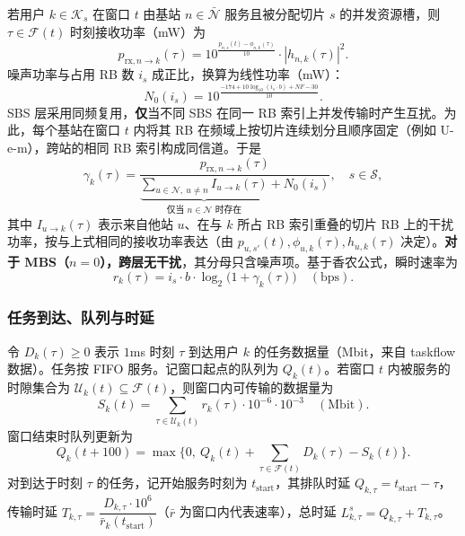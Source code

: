 若用户 $k\in\mathcal{K}_s$ 在窗口 $t$ 由基站 $n\in\bar{\mathcal{N}}$ 服务且被分配切片 $s$ 的并发资源槽，则 $\tau\in\mathcal{F}(t)$ 时刻接收功率（mW）为
\begin{equation}
 p_{\mathrm{rx},n\to k}(\tau)=10^{\frac{p_{n,s}(t)-\phi_{n,k}(\tau)}{10}}\cdot |h_{n,k}(\tau)|^2.
\end{equation}
噪声功率与占用 RB 数 $i_s$ 成正比，换算为线性功率（mW）：
\begin{equation}
 N_0(i_s)=10^{\frac{-174+10\log_{10}(i_s\cdot b)+NF-30}{10}}.
\end{equation}
SBS 层采用同频复用，\textbf{仅}当不同 SBS 在同一 RB 索引上并发传输时产生互扰。为此，每个基站在窗口 $t$ 内将其 RB 在频域上按切片连续划分且顺序固定（例如 U-e-m），跨站的相同 RB 索引构成同信道。于是
\begin{equation}
 \gamma_k(\tau)=\frac{p_{\mathrm{rx},n\to k}(\tau)}{\underbrace{\sum\limits_{u\in\mathcal{N},\ u\neq n} I_{u\to k}(\tau)}_{\text{仅当 }n\in\mathcal{N}\text{ 时存在}}+N_0(i_s)},\quad s\in\mathcal{S},
\end{equation}
其中 $I_{u\to k}(\tau)$ 表示来自他站 $u$、在与 $k$ 所占 RB 索引重叠的切片 RB 上的干扰功率，按与上式相同的接收功率表达（由 $p_{u,s'}(t),\phi_{u,k}(\tau),h_{u,k}(\tau)$ 决定）。\textbf{对于 MBS（$n=0$），跨层无干扰}，其分母只含噪声项。基于香农公式，瞬时速率为
\begin{equation}
 r_k(\tau)=i_s\cdot b\cdot \log_2\big(1+\gamma_k(\tau)\big)\quad(\mathrm{bps}).
\end{equation}

\subsubsection{任务到达、队列与时延}

令 $D_k(\tau)\ge 0$ 表示 $1$ms 时刻 $\tau$ 到达用户 $k$ 的任务数据量（Mbit，来自 taskflow 数据）。任务按 FIFO 服务。记窗口起点的队列为 $Q_k(t)$。若窗口 $t$ 内被服务的时隙集合为 $\mathcal{U}_k(t)\subseteq\mathcal{F}(t)$，则窗口内可传输的数据量为
\begin{equation}
 S_k(t)=\sum_{\tau\in\mathcal{U}_k(t)} r_k(\tau)\cdot 10^{-6}\cdot 10^{-3}\quad(\mathrm{Mbit}).
\end{equation}
窗口结束时队列更新为
\begin{equation}
 Q_k(t+100)=\max\Big\{0,\ Q_k(t)+\sum_{\tau\in\mathcal{F}(t)} D_k(\tau)-S_k(t)\Big\}.
\end{equation}
对到达于时刻 $\tau$ 的任务，记开始服务时刻为 $t_{\text{start}}$，其排队时延 $Q_{k,\tau}=t_{\text{start}}-\tau$，传输时延 $T_{k,\tau}=\dfrac{D_{k,\tau}\cdot 10^6}{\bar{r}_k(t_{\text{start}})}$（$\bar{r}$ 为窗口内代表速率），总时延 $L^{s}_{k,\tau}=Q_{k,\tau}+T_{k,\tau}$。

